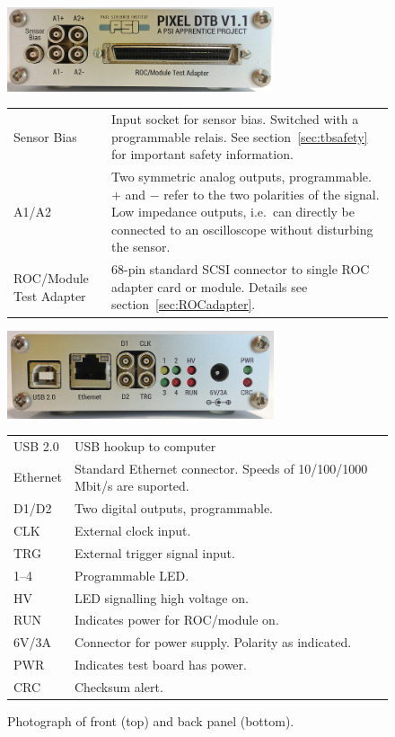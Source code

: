 \begin{figure}[hbtp]
    \begin{center}
	\includegraphics[width=0.7\textwidth]{img/DTB_front_full.jpg}

	\medskip

	\begin{tabular}{lp{10cm}}
	    Sensor Bias & Input socket for sensor bias. Switched with a programmable relais. See section~\ref{sec:tbsafety} for important safety information. \\
	    A1/A2 & Two symmetric analog outputs, programmable. $+$ and $-$ refer to the two polarities of the signal. Low impedance outputs, i.e.~can directly be connected to an oscilloscope without disturbing the sensor. \\
	    ROC/Module Test Adapter & 68-pin standard SCSI connector to single ROC adapter card or module. Details see section~\ref{sec:ROCadapter}. \\
	\end{tabular}

	\bigskip

	\bigskip

	\includegraphics[width=0.7\textwidth]{img/DTB_back_full.jpg}

	\medskip

	\begin{tabular}{lp{10cm}}
	    USB 2.0 & USB hookup to computer \\
	    Ethernet & Standard Ethernet connector. Speeds of 10/100/1000\,Mbit/s are suported. \\
	    D1/D2 & Two digital outputs, programmable. \\
	    CLK & External clock input. \\
	    TRG & External trigger signal input. \\
	    1--4 & Programmable LED. \\
	    HV & LED signalling high voltage on. \\
	    RUN & Indicates power for ROC/module on. \\
	    6V/3A & Connector for power supply. Polarity as indicated. \\
	    PWR & Indicates test board has power. \\
	    CRC & Checksum alert. \todo{Explain} \\
	\end{tabular}
	\caption{Photograph of front (top) and back panel (bottom).}
	\label{fig:DTBphotoPanels}
    \end{center}
\end{figure}

